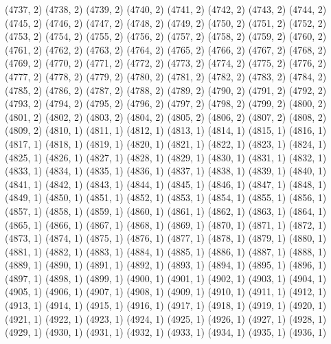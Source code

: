 {   (4737, 2)
   (4738, 2)
   (4739, 2)
   (4740, 2)
   (4741, 2)
   (4742, 2)
   (4743, 2)
   (4744, 2)
   (4745, 2)
   (4746, 2)
   (4747, 2)
   (4748, 2)
   (4749, 2)
   (4750, 2)
   (4751, 2)
   (4752, 2)
   (4753, 2)
   (4754, 2)
   (4755, 2)
   (4756, 2)
   (4757, 2)
   (4758, 2)
   (4759, 2)
   (4760, 2)
   (4761, 2)
   (4762, 2)
   (4763, 2)
   (4764, 2)
   (4765, 2)
   (4766, 2)
   (4767, 2)
   (4768, 2)
   (4769, 2)
   (4770, 2)
   (4771, 2)
   (4772, 2)
   (4773, 2)
   (4774, 2)
   (4775, 2)
   (4776, 2)
   (4777, 2)
   (4778, 2)
   (4779, 2)
   (4780, 2)
   (4781, 2)
   (4782, 2)
   (4783, 2)
   (4784, 2)
   (4785, 2)
   (4786, 2)
   (4787, 2)
   (4788, 2)
   (4789, 2)
   (4790, 2)
   (4791, 2)
   (4792, 2)
   (4793, 2)
   (4794, 2)
   (4795, 2)
   (4796, 2)
   (4797, 2)
   (4798, 2)
   (4799, 2)
   (4800, 2)
   (4801, 2)
   (4802, 2)
   (4803, 2)
   (4804, 2)
   (4805, 2)
   (4806, 2)
   (4807, 2)
   (4808, 2)
   (4809, 2)
   (4810, 1)
   (4811, 1)
   (4812, 1)
   (4813, 1)
   (4814, 1)
   (4815, 1)
   (4816, 1)
   (4817, 1)
   (4818, 1)
   (4819, 1)
   (4820, 1)
   (4821, 1)
   (4822, 1)
   (4823, 1)
   (4824, 1)
   (4825, 1)
   (4826, 1)
   (4827, 1)
   (4828, 1)
   (4829, 1)
   (4830, 1)
   (4831, 1)
   (4832, 1)
   (4833, 1)
   (4834, 1)
   (4835, 1)
   (4836, 1)
   (4837, 1)
   (4838, 1)
   (4839, 1)
   (4840, 1)
   (4841, 1)
   (4842, 1)
   (4843, 1)
   (4844, 1)
   (4845, 1)
   (4846, 1)
   (4847, 1)
   (4848, 1)
   (4849, 1)
   (4850, 1)
   (4851, 1)
   (4852, 1)
   (4853, 1)
   (4854, 1)
   (4855, 1)
   (4856, 1)
   (4857, 1)
   (4858, 1)
   (4859, 1)
   (4860, 1)
   (4861, 1)
   (4862, 1)
   (4863, 1)
   (4864, 1)
   (4865, 1)
   (4866, 1)
   (4867, 1)
   (4868, 1)
   (4869, 1)
   (4870, 1)
   (4871, 1)
   (4872, 1)
   (4873, 1)
   (4874, 1)
   (4875, 1)
   (4876, 1)
   (4877, 1)
   (4878, 1)
   (4879, 1)
   (4880, 1)
   (4881, 1)
   (4882, 1)
   (4883, 1)
   (4884, 1)
   (4885, 1)
   (4886, 1)
   (4887, 1)
   (4888, 1)
   (4889, 1)
   (4890, 1)
   (4891, 1)
   (4892, 1)
   (4893, 1)
   (4894, 1)
   (4895, 1)
   (4896, 1)
   (4897, 1)
   (4898, 1)
   (4899, 1)
   (4900, 1)
   (4901, 1)
   (4902, 1)
   (4903, 1)
   (4904, 1)
   (4905, 1)
   (4906, 1)
   (4907, 1)
   (4908, 1)
   (4909, 1)
   (4910, 1)
   (4911, 1)
   (4912, 1)
   (4913, 1)
   (4914, 1)
   (4915, 1)
   (4916, 1)
   (4917, 1)
   (4918, 1)
   (4919, 1)
   (4920, 1)
   (4921, 1)
   (4922, 1)
   (4923, 1)
   (4924, 1)
   (4925, 1)
   (4926, 1)
   (4927, 1)
   (4928, 1)
   (4929, 1)
   (4930, 1)
   (4931, 1)
   (4932, 1)
   (4933, 1)
   (4934, 1)
   (4935, 1)
   (4936, 1)
}
